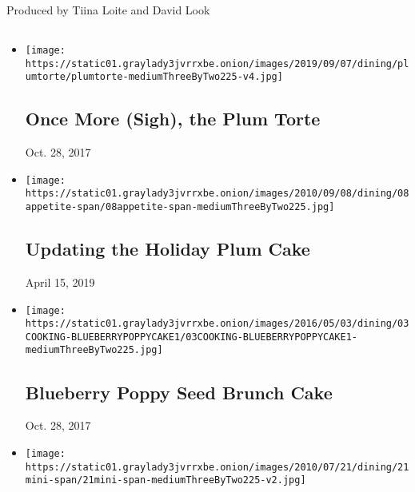 Produced by Tiina Loite and David Look

\subsection{}

\begin{itemize}
\item
  \href{}{}

  \texttt{[image: https://static01.graylady3jvrrxbe.onion/images/2019/09/07/dining/plumtorte/plumtorte-mediumThreeByTwo225-v4.jpg]}

  \hypertarget{once-more-sigh-the-plum-torte}{%
  \subsection{Once More (Sigh), the Plum
  Torte}\label{once-more-sigh-the-plum-torte}}

  Oct. 28, 2017
\item
  \href{https://www.nytimes3xbfgragh.onion/2010/09/08/dining/08appe.html}{}

  \texttt{[image: https://static01.graylady3jvrrxbe.onion/images/2010/09/08/dining/08appetite-span/08appetite-span-mediumThreeByTwo225.jpg]}

  \hypertarget{updating-the-holiday-plum-cake}{%
  \subsection{Updating the Holiday Plum
  Cake}\label{updating-the-holiday-plum-cake}}

  April 15, 2019
\item
  \href{}{}

  \texttt{[image: https://static01.graylady3jvrrxbe.onion/images/2016/05/03/dining/03COOKING-BLUEBERRYPOPPYCAKE1/03COOKING-BLUEBERRYPOPPYCAKE1-mediumThreeByTwo225.jpg]}

  \hypertarget{blueberry-poppy-seed-brunch-cake}{%
  \subsection{Blueberry Poppy Seed Brunch
  Cake}\label{blueberry-poppy-seed-brunch-cake}}

  Oct. 28, 2017
\item
  \href{}{}

  \texttt{[image: https://static01.graylady3jvrrxbe.onion/images/2010/07/21/dining/21mini-span/21mini-span-mediumThreeByTwo225-v2.jpg]}


\end{itemize}

